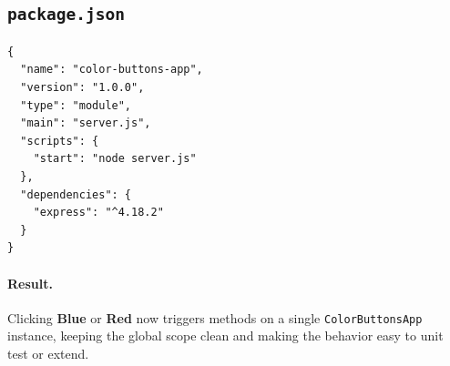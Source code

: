 \subsection*{\texttt{package.json}}
\begin{verbatim}
{
  "name": "color-buttons-app",
  "version": "1.0.0",
  "type": "module",
  "main": "server.js",
  "scripts": {
    "start": "node server.js"
  },
  "dependencies": {
    "express": "^4.18.2"
  }
}
\end{verbatim}

\paragraph{Result.}
Clicking \textbf{Blue} or \textbf{Red} now triggers methods on a single \texttt{ColorButtonsApp} instance, keeping the global scope clean and making the behavior easy to unit test or extend.
